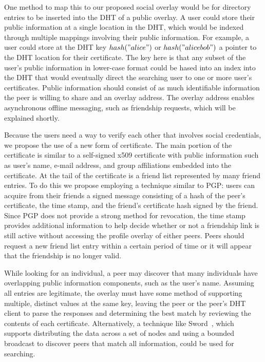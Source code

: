 \documentclass[conference]{IEEEtran}
\begin{document}
One method to map this to our proposed social overlay would be for directory
entries to be inserted into the DHT of a public overlay.  A user could store
their public information at a single location in the DHT, which would be
indexed through multiple mappings involving their public information.  For
example, a user could store at the DHT key $hash("alice")$ or $hash("alice
bob")$ a pointer to the DHT location for their certificate.  The key here is
that any subset of the user's public information in lower-case format could be
hased into an index into the DHT that would eventually direct the searching
user to one or more user's certificates.  Public information should consist of
as much identifiable information the peer is willing to share and an overlay
address.  The overlay address enables asynchronous offline messaging, such as
friendship requests, which will be explained shortly.

Because the users need a way to verify each other that involves social
credentials, we propose the use of a new form of certificate.  The main
portion of the certificate is similar to a self-signed x509 certificate with
public information such as user's name, e-mail address, and group affiliations
embedded into the certificate.  At the tail of the certificate is a friend
list represented by many friend entries.  To do this we propose employing a
technique similar to PGP: users can acquire from their friends a signed
message consisting of a hash of the peer's certificate, the time stamp, and
the friend's certificate hash signed by the friend.  Since PGP does not
provide a strong method for revocation, the time stamp provides additional
information to help decide whether or not a friendship link is still active
without accessing the profile overlay of either peers.  Peers should request a
new friend list entry within a certain period of time or it will appear that
the friendship is no longer valid.

While looking for an individual, a peer may discover that many individuals
have overlapping public information components, such as the user's name.
Assuming all entries are legitimate, the overlay must have some method of
supporting multiple, distinct values at the same key, leaving the peer or the
peer's DHT client to parse the responses and determining the best match by
reviewing the contents of each certificate.  Alternatively, a technique like
Sword~\cite{sword}, which supports distributing the data across a set of nodes
and using a bounded broadcast to discover peers that match all information,
could be used for searching.
\end{document}
